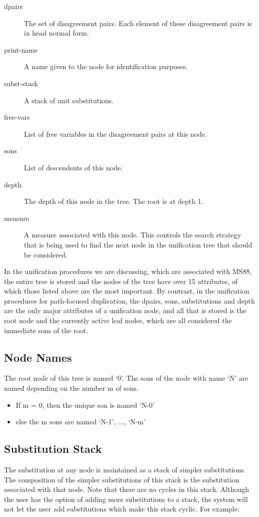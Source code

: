 \begin{description}
\item[dpairs]	 The set of disagreement pairs. Each element of these disagreement pairs
is in head normal form.

\item[print-name]	 A name given to the node for identification purposes.

\item[subst-stack]	 A stack of unit substitutions.

\item[free-vars]	 List of free variables in the disagreement pairs at this node.

\item[sons]	 List of descendents of this node.

\item[depth]	 The depth of this node in the tree. The root is at depth 1.

\item[measure]	 A measure associated with this node. This controls the search strategy
that is being used to find the next node in the unification tree that should
be considered.
\end{description}

In the unification procedures we are discussing, which are associated with MS88, the
entire tree is stored and the nodes of the tree have over 15 attributes, of which
those listed above are the most important.
By contrast, in the unification procedures for path-focused duplication,
the dpairs, sons, substitutions and depth are the only major attributes of a unification
node, and all that is stored is the root node and the currently active leaf nodes, which
are all considered the immediate sons of the root.

\subsection{Node Names}
The root node of this tree is named `0'. The sons of the node with name
`N' are named depending on the number m of sons.

\begin{itemize}
\item If m = 0, then the unique son is named `N-0'

\item else the m sons are named `N-1', ..., `N-m'
\end{itemize}

\subsection{Substitution Stack}
The substitution at any node is maintained as a stack of simpler
substitutions. The composition of the simpler substitutions of this stack
is the substitution associated with that node. Note that there are no
cycles in this stack. Although the user has the option of adding
more substitutions to a stack, the system will not let the user add
substitutions which make this stack cyclic. For example:

